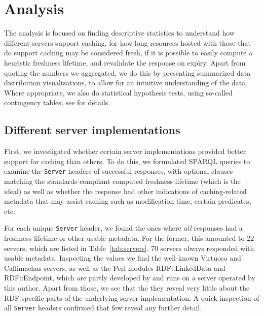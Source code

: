 \documentclass{llncs}
\newcommand{\httph}[1]{\texttt{#1}}
\begin{document}
\section{Analysis}

The analysis is focused on finding descriptive statistics to
understand how different servers support caching, for how long
resources hosted with those that do support caching may be considered
fresh, if it is possible to easily compute a heuristic freshness
lifetime, and revalidate the response on expiry. Apart from quoting
the numbers we aggregated, we do this by presenting summarized data
distribution visualizations, to allow for an intuitive understanding
of the data. Where appropriate, we also do statistical hypothesis
tests, using so-called contingency tables, see
\cite{kjernsmo_add_survey_2015} for details.

\subsection{Different server implementations}

First, we investigated whether certain server implementations provided
better support for caching than others. To do this, we formulated
SPARQL queries to examine the \httph{Server} headers of successful
responses, with optional clauses matching the standards-compliant
computed freshness lifetime (which is the ideal) as well as whether
the response had other indications of caching-related metadata that
may assist caching such as modification time, certain predicates, etc.

For each unique \httph{Server} header, we found the ones where
\emph{all} responses had a freshness lifetime or other usable
metadata. For the former, this amounted to 22 servers, which are
listed in Table~\ref{tab:servers}.  70 servers always responded with
usable metadata. Inspecting the values we find the well-known Virtuoso
and Callimachus servers, as well as the Perl modules
RDF::LinkedData and RDF::Endpoint, which are partly
developed by and runs on a server operated by this author. Apart from
those, we see that the they reveal very little about the RDF-specific
parts of the underlying server implementation. A quick inspection of
all \httph{Server} headers confirmed that few reveal any further
detail.
\end{document}
